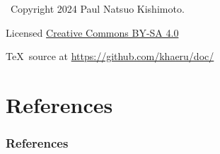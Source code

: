\documentclass[12pt,aspectratio=169]{beamer}
\begin{document}
\begin{frame}[c,plain]
  \vfill
  {\centering \Huge {}}

  \vfill
  \textcopyright\ Copyright 2024 Paul Natsuo Kishimoto.

  Licensed \href{https://creativecommons.org/licenses/by-sa/4.0/}{Creative Commons BY-SA 4.0}

  \TeX\ source at \url{https://github.com/khaeru/doc/}
\end{frame}

\appendix

\section{References}

\begin{frame}
\frametitle{References}

\nocite{de-weck-roos-magee-2011}

\printbibliography[heading=none]

\end{frame}
\end{document}
